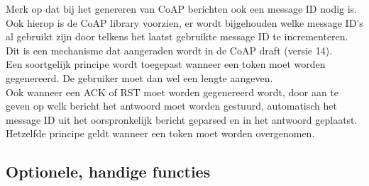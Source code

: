Merk op dat bij het genereren van CoAP berichten ook een message ID nodig is. Ook hierop is de CoAP library voorzien, er wordt bijgehouden welke message ID's al gebruikt zijn door telkens het laatst gebruikte message ID te incrementeren. Dit is een mechanisme dat aangeraden wordt in de CoAP draft (versie 14).\\
Een soortgelijk principe wordt toegepast wanneer een token moet worden gegenereerd. De gebruiker moet dan wel een lengte aangeven.\\
Ook wanneer een ACK of RST moet worden gegenereerd wordt, door aan te geven op welk bericht het antwoord moet worden gestuurd, automatisch het message ID uit het oorspronkelijk bericht geparsed en in het antwoord geplaatst. Hetzelfde principe geldt wanneer een token moet worden overgenomen.

\subsection{Optionele, handige functies}

